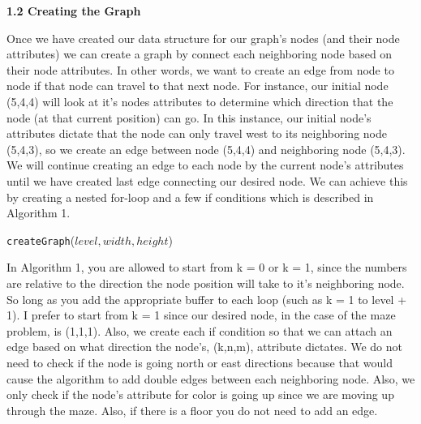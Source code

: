 \documentclass[12pt]{article}
\begin{document}
\vspace{0.1in}
\textbf{1.2 Creating the Graph}

Once we have created our data structure for our graph's nodes (and their node attributes) we can create a graph by connect each neighboring node based on their node attributes. In other words, we want to create an edge from node to node if that node can travel to that next node. For instance, our initial node (5,4,4) will look at it's nodes attributes to determine which direction that the node (at that current position) can go. In this instance, our initial node's attributes dictate that the node can only travel west to its neighboring node (5,4,3), so we create an edge between node (5,4,4) and neighboring node (5,4,3). We will continue creating an edge to each node by the current node's attributes until we have created last edge connecting our desired node. We can achieve this by creating a nested for-loop and a few if conditions which is described in Algorithm 1. \\

\begin{algorithm}
  \caption{\texttt{createGraph}($level, width, height$)}
\end{algorithm}

In Algorithm 1, you are allowed to start from k = 0 or k = 1, since the numbers are relative to the direction the node position will take to it's neighboring node. So long as you add the appropriate buffer to each loop (such as k = 1 to level + 1). I prefer to start from k = 1 since our desired node, in the case of the maze problem, is (1,1,1). Also, we create each if condition so that we can attach an edge based on what direction the node's, (k,n,m), attribute dictates. We do not need to check if the node is going north or east directions because that would cause the algorithm to add double edges between each neighboring node. Also, we only check if the node's attribute for color is going up since we are moving up through the maze. Also, if there is a floor you do not need to add an edge. \\
\end{document}
